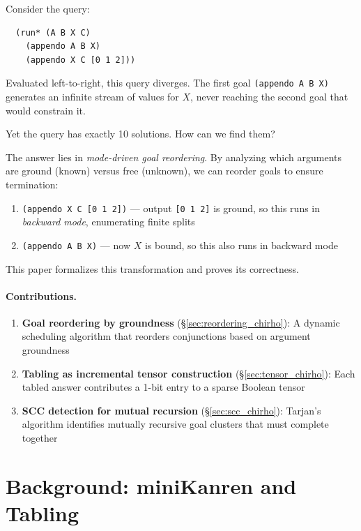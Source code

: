 \documentclass[11pt,a4paper]{article}
\begin{document}
\scopeclarification

Consider the query:
\begin{verbatim}
  (run* (A B X C)
    (appendo A B X)
    (appendo X C [0 1 2]))
\end{verbatim}

Evaluated left-to-right, this query diverges. The first goal
\texttt{(appendo A B X)} generates an infinite stream of values for $X$,
never reaching the second goal that would constrain it.

Yet the query has exactly 10 solutions. How can we find them?

The answer lies in \emph{mode-driven goal reordering}. By analyzing which
arguments are ground (known) versus free (unknown), we can reorder goals
to ensure termination:

\begin{enumerate}
  \item \texttt{(appendo X C [0 1 2])} --- output \texttt{[0 1 2]} is ground,
        so this runs in \emph{backward mode}, enumerating finite splits
  \item \texttt{(appendo A B X)} --- now $X$ is bound, so this also runs
        in backward mode
\end{enumerate}

This paper formalizes this transformation and proves its correctness.

\paragraph{Contributions.}
\begin{enumerate}
  \item \textbf{Goal reordering by groundness} (\S\ref{sec:reordering_chirho}):
        A dynamic scheduling algorithm that reorders conjunctions based on
        argument groundness
  \item \textbf{Tabling as incremental tensor construction}
        (\S\ref{sec:tensor_chirho}): Each tabled answer contributes a 1-bit
        entry to a sparse Boolean tensor
  \item \textbf{SCC detection for mutual recursion} (\S\ref{sec:scc_chirho}):
        Tarjan's algorithm identifies mutually recursive goal clusters that
        must complete together
\end{enumerate}

\section{Background: miniKanren and Tabling}
\label{sec:background_chirho}
\end{document}
